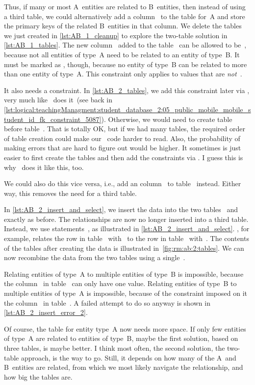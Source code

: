 Thus, if many or most A~entities are related to B~entities, then instead of using a third table, we could alternatively add a column~ to the table for~A and store the primary keys of the related B~entities in that column.
We delete the tables we just created in \cref{lst:AB_1_cleanup} to explore the two-table solution in \cref{lst:AB_1_tables}.
The new column~ added to the table~ can be allowed to be~, because not all entities of type~A need to be related to an entity of type~B.
It must be marked as , though, because no entity of type~B can be related to more than one entity of type~A.
This constraint only applies to values that are \emph{not}~.

It also needs a  constraint.
In \cref{lst:AB_2_tables}, we add this constraint later via , very much like \pgmodeler\ does it~(see back in \cref{lst:logical:teachingManagment:student_database_2:05_public_mobile_mobile_student_id_fk_constraint_5087}).
Otherwise, we would need to create table~ before table~.
That is totally OK, but if we had many tables, the required order of table creation could make our \sql\ code harder to read.
Also, the probability of making errors that are hard to figure out would be higher.
It sometimes is just easier to first create the tables and then add the constraints via .
I guess this is why \pgmodeler\ does it like this, too.

We could also do this vice versa, i.e., add an column~ to table~ instead.
Either way, this removes the need for a third table.

In \cref{lst:AB_2_insert_and_select}, we insert the data into the two tables~ and~ exactly as before.
The relationships are now no longer inserted into a third table.
Instead, we use  statements~\cite{PGDG:PD:U}, as illustrated in \cref{lst:AB_2_insert_and_select}.
, for example, relates the row in table~ with~ to the row in table~ with~.
The contents of the tables after creating the data is illustrated in~\cref{fig:rm:ab:2:tables}.
We can now recombine the data from the two tables using a single~.

Relating entities of type~A to multiple entities of type~B is impossible, because the column~ in table~ can only have one value.
Relating entities of type~B to multiple entities of type~A is impossible, because of the  constraint imposed on it the column~ in table~.
A failed attempt to do so anyway is shown in \cref{lst:AB_2_insert_error_2}.

Of course, the table for entity type~A now needs more space.
If only few entities of type~A are related to entities of type~B, maybe the first solution, based on three tables, is maybe better.
I think most often, the second solution, the two-table approach, is the way to go.
Still, it depends on how many of the A~and B~entities are related, from which  we most likely navigate the relationship, and how big the tables are.%
%
\FloatBarrier%
\endhsection%
